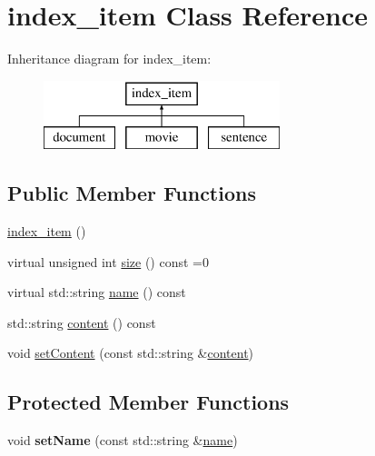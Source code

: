 \hypertarget{classindex__item}{}\section{index\+\_\+item Class Reference}
\label{classindex__item}
Inheritance diagram for index\+\_\+item\+:\begin{figure}[H]
\begin{center}
\leavevmode
\includegraphics[height=2.000000cm]{classindex__item}
\end{center}
\end{figure}
\subsection*{Public Member Functions}
\begin{DoxyCompactItemize}
\item 
\hyperlink{classindex__item_a26948d7ad5975fe8160fdedb58df9904}{index\+\_\+item} ()
\item 
virtual unsigned int \hyperlink{classindex__item_ae8ccce55ab973b1a2faa99df65e19051}{size} () const =0
\item 
virtual std\+::string \hyperlink{classindex__item_a1bcb5c577c3986549330c3aa283a6a5e}{name} () const
\item 
std\+::string \hyperlink{classindex__item_aafe86cc0ad7284d6db317588f63d1cb2}{content} () const
\item 
void \hyperlink{classindex__item_a2a69d5f19a1e7056fef20df01dbc489e}{set\+Content} (const std\+::string \&\hyperlink{classindex__item_aafe86cc0ad7284d6db317588f63d1cb2}{content})
\end{DoxyCompactItemize}
\subsection*{Protected Member Functions}
\begin{DoxyCompactItemize}
\item 
\mbox{\label{classindex__item_acc2da343f8c0dd1502ee80f11b41522e}} 
void {\bfseries set\+Name} (const std\+::string \&\hyperlink{classindex__item_a1bcb5c577c3986549330c3aa283a6a5e}{name})
\end{DoxyCompactItemize}
